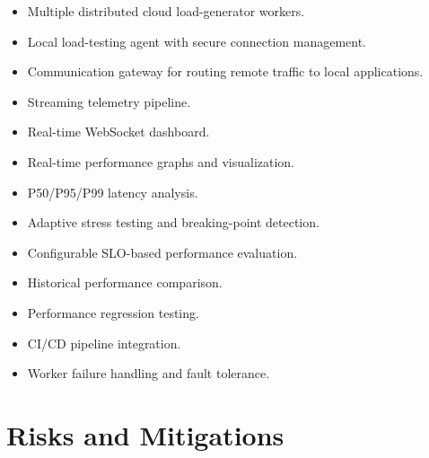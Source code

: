 \documentclass[11pt,a4paper]{article}
\begin{document}
\begin{itemize}[leftmargin=0.7cm]

    \item Multiple distributed cloud load-generator workers.

    \item Local load-testing agent with secure connection management.

    \item Communication gateway for routing remote traffic to local
    applications.

    \item Streaming telemetry pipeline.

    \item Real-time WebSocket dashboard.

    \item Real-time performance graphs and visualization.

    \item P50/P95/P99 latency analysis.

    \item Adaptive stress testing and breaking-point detection.

    \item Configurable SLO-based performance evaluation.

    \item Historical performance comparison.

    \item Performance regression testing.

    \item CI/CD pipeline integration.

    \item Worker failure handling and fault tolerance.

\end{itemize}

\section{Risks and Mitigations}
\end{document}
